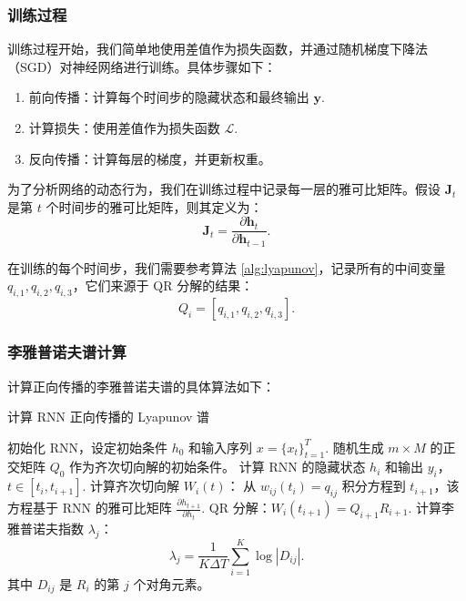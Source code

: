 \subsubsection{训练过程}\label{sec:rnn_training}

训练过程开始，我们简单地使用差值作为损失函数，并通过随机梯度下降法（SGD）对神经网络进行训练。具体步骤如下：

\begin{enumerate}
  \item 前向传播：计算每个时间步的隐藏状态和最终输出 \(\mathbf{y}\).
  \item 计算损失：使用差值作为损失函数 \(\mathcal{L}\).
  \item 反向传播：计算每层的梯度，并更新权重。
\end{enumerate}

为了分析网络的动态行为，我们在训练过程中记录每一层的雅可比矩阵。假设 \(\mathbf{J}_t\) 是第 \(t\) 个时间步的雅可比矩阵，则其定义为：
\begin{equation}
  \mathbf{J}_t = \frac{\partial \mathbf{h}_t}{\partial \mathbf{h}_{t-1}}.
\end{equation}

在训练的每个时间步，我们需要参考算法 \ref{alg:lyapunov}，记录所有的中间变量 $q_{i,1}, q_{i, 2}, q_{i, 3}$，它们来源于 QR 分解的结果：
\begin{equation}
  Q_i = [q_{i,1}, q_{i,2}, q_{i,3}].
\end{equation}

\clearpage

\subsubsection{李雅普诺夫谱计算}

计算正向传播的李雅普诺夫谱的具体算法如下：

\begin{algorithm}[H]
  \caption{计算 RNN 正向传播的 Lyapunov 谱}
  \begin{algorithmic}[1]
  \STATE 初始化 RNN，设定初始条件 $h_0$ 和输入序列 $x = \{x_t\}_{t=1}^T$.
  \STATE 随机生成 $m \times M$ 的正交矩阵 $Q_0$ 作为齐次切向解的初始条件。
      \STATE 计算 RNN 的隐藏状态 $h_i$ 和输出 $y_i$，$t \in [t_i, t_{i+1}]$.
      \STATE 计算齐次切向解 $W_i(t)$：
          \STATE 从 $w_{ij}(t_i) = q_{ij}$ 积分方程到 $t_{i+1}$，该方程基于 RNN 的雅可比矩阵 $\frac{\partial h_{t+1}}{\partial h_t}$.
      \ENDFOR
      \STATE QR 分解：$W_i(t_{i+1}) = Q_{i+1} R_{i+1}$.
  \ENDFOR
  \STATE 计算李雅普诺夫指数 $\lambda_j$：
  \begin{equation}
  \lambda_j = \frac{1}{K \Delta T} \sum_{i=1}^K \log |D_{ij}|.
  \end{equation}
  其中 $D_{ij}$ 是 $R_i$ 的第 $j$ 个对角元素。
  \end{algorithmic}
\end{algorithm}

